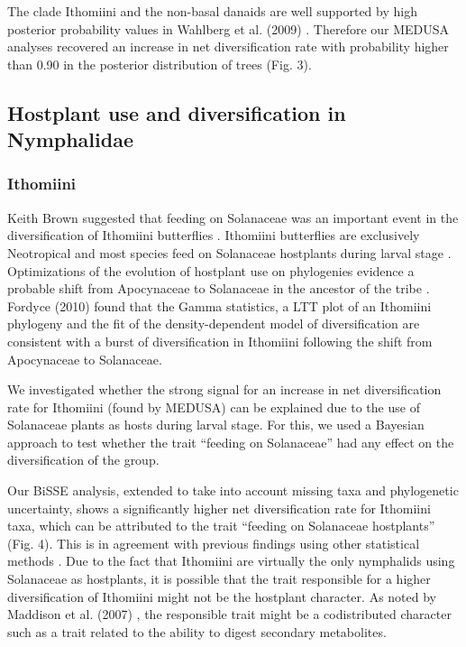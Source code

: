 \documentclass[10pt]{article}
\begin{document}
The clade Ithomiini and the non-basal danaids are well supported by high
posterior probability values in Wahlberg et al. (2009) \cite{wahlberg2009}.
Therefore our MEDUSA analyses recovered an increase in net
diversification rate with probability higher than 0.90 in the posterior
distribution of trees (Fig. 3).


\subsection*{Hostplant use and diversification in
Nymphalidae}

\subsubsection*{Ithomiini}

Keith Brown suggested that feeding on Solanaceae was an important event
in the diversification of Ithomiini butterflies \cite{brown1987}. Ithomiini
butterflies are exclusively Neotropical and most species feed on
Solanaceae hostplants during larval stage \cite{willmott2006}. Optimizations of the
evolution of hostplant use on phylogenies evidence a probable shift from
Apocynaceae to Solanaceae in the ancestor of the tribe \cite{willmott2006, brower2006}.
Fordyce (2010) \cite{fordyce2010} found that the Gamma statistics, a LTT plot of
an Ithomiini phylogeny and the fit of the density-dependent model of
diversification are consistent with a burst of diversification in
Ithomiini following the shift from Apocynaceae to Solanaceae.

We investigated whether the strong signal for an increase in net
diversification rate for Ithomiini (found by MEDUSA) can be explained
due to the use of Solanaceae plants as hosts during larval stage. For
this, we used a Bayesian approach \cite{fitzjohn2009} to test whether the trait
``feeding on Solanaceae'' had any effect on the diversification of the
group.

Our BiSSE analysis, extended to take into account missing taxa and
phylogenetic uncertainty, shows a significantly higher net
diversification rate for Ithomiini taxa, which can be attributed to the
trait ``feeding on Solanaceae hostplants'' (Fig. 4). This is in
agreement with previous findings using other statistical methods
\cite{fordyce2010}. Due to the fact that Ithomiini are virtually the only
nymphalids using Solanaceae as hostplants, it is possible that the trait
responsible for a higher diversification of Ithomiini might not be the
hostplant character. As noted by Maddison et al. (2007) \cite{maddison2007}, the
responsible trait might be a codistributed character such as a trait
related to the ability to digest secondary metabolites.
\end{document}
